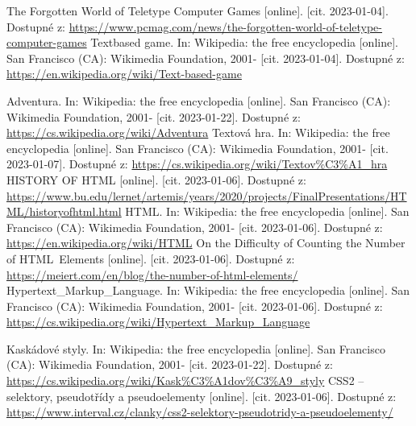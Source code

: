 \documentclass[main.tex]{subfiles}
\begin{document}
\renewcommand{\refname}{Seznam použité literatury a~zdrojů informací} 

\begin{thebibliography}{99}


 The Forgotten World of Teletype Computer Games [online]. [cit. 2023-01-04]. Dostupné z: \url{https://www.pcmag.com/news/the-forgotten-world-of-teletype-computer-games}
 Textbased game. In: Wikipedia: the free encyclopedia [online]. San Francisco (CA): Wikimedia Foundation, 2001- [cit. 2023-01-04]. Dostupné z: \url{https://en.wikipedia.org/wiki/Text-based-game}

 Adventura. In: Wikipedia: the free encyclopedia [online]. San Francisco (CA): Wikimedia Foundation, 2001- [cit. 2023-01-22]. Dostupné z: \url{https://cs.wikipedia.org/wiki/Adventura}
 Textová hra. In: Wikipedia: the free encyclopedia [online]. San Francisco (CA): Wikimedia Foundation, 2001- [cit. 2023-01-07]. Dostupné z: \url{https://cs.wikipedia.org/wiki/Textov\%C3\%A1_hra}
 HISTORY OF HTML [online]. [cit. 2023-01-06]. Dostupné z: \url{https://www.bu.edu/lernet/artemis/years/2020/projects/FinalPresentations/HTML/historyofhtml.html} 
 HTML. In: Wikipedia: the free encyclopedia [online]. San Francisco (CA): Wikimedia Foundation, 2001- [cit. 2023-01-06]. Dostupné z: \url{https://en.wikipedia.org/wiki/HTML}
 On the Difficulty of Counting the Number of HTML Elements [online]. [cit. 2023-01-06]. Dostupné z: \url{https://meiert.com/en/blog/the-number-of-html-elements/}
 Hypertext\_Markup\_Language. In: Wikipedia: the free encyclopedia [online]. San Francisco (CA): Wikimedia Foundation, 2001- [cit. 2023-01-06]. Dostupné z: \url{https://cs.wikipedia.org/wiki/Hypertext\_Markup\_Language}

 Kaskádové styly. In: Wikipedia: the free encyclopedia [online]. San Francisco (CA): Wikimedia Foundation, 2001- [cit. 2023-01-22]. Dostupné z: \url{https://cs.wikipedia.org/wiki/Kask\%C3\%A1dov\%C3\%A9_styly}
 CSS2 – selektory, pseudotřídy a pseudoelementy [online]. [cit. 2023-01-06]. Dostupné z: \url{https://www.interval.cz/clanky/css2-selektory-pseudotridy-a-pseudoelementy/}


\end{thebibliography}
\end{document}

